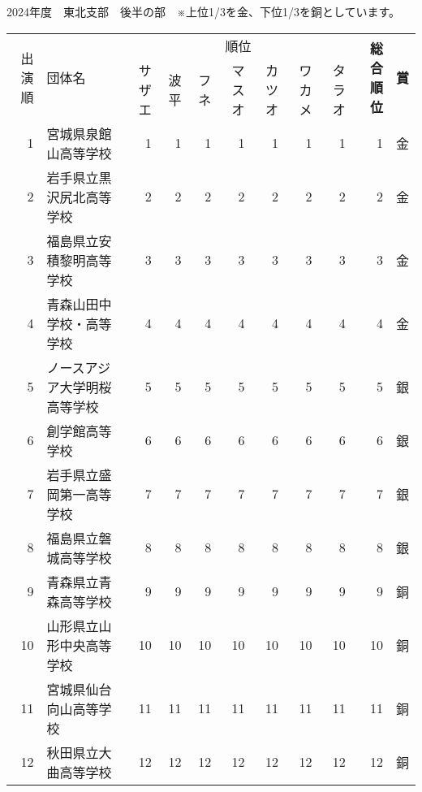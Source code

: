 \documentclass[11pt,a4paper,landscape,twoside,openany,english,uplatex]{jsarticle}
\begin{document}
2024年度　東北支部　後半の部　※上位1/3を金、下位1/3を銅としています。
\begin{table}[H]
 \centering
 \begin{tabular}{r|l|rrrrrrr|r|c}
  \hline
  \multirow{2}{*}{出演順} & \multirow{2}{*}{団体名} & \multicolumn{7}{|c|}{順位} & \multirow{2}{*}{\textbf{総合順位}} &  \multirow{2}{*}{\textbf{賞}} \\
  \cline{3-9} %
    &  & サザエ & 波平 & フネ & マスオ &  カツオ & ワカメ & タラオ &  &  \\
  \hline \hline
   1 & 宮城県泉館山高等学校         &  1 &  1 &  1 &  1 &  1 &  1 &  1 &  1 & 金 \\
   2 & 岩手県立黒沢尻北高等学校     &  2 &  2 &  2 &  2 &  2 &  2 &  2 &  2 & 金 \\
   3 & 福島県立安積黎明高等学校     &  3 &  3 &  3 &  3 &  3 &  3 &  3 &  3 & 金 \\
   4 & 青森山田中学校・高等学校     &  4 &  4 &  4 &  4 &  4 &  4 &  4 &  4 & 金 \\
   5 & ノースアジア大学明桜高等学校 &  5 &  5 &  5 &  5 &  5 &  5 &  5 &  5 & 銀 \\
   6 & 創学館高等学校               &  6 &  6 &  6 &  6 &  6 &  6 &  6 &  6 & 銀 \\
   7 & 岩手県立盛岡第一高等学校     &  7 &  7 &  7 &  7 &  7 &  7 &  7 &  7 & 銀 \\
   8 & 福島県立磐城高等学校         &  8 &  8 &  8 &  8 &  8 &  8 &  8 &  8 & 銀 \\
   9 & 青森県立青森高等学校         &  9 &  9 &  9 &  9 &  9 &  9 &  9 &  9 & 銅 \\
  10 & 山形県立山形中央高等学校     & 10 & 10 & 10 & 10 & 10 & 10 & 10 & 10 & 銅 \\
  11 & 宮城県仙台向山高等学校       & 11 & 11 & 11 & 11 & 11 & 11 & 11 & 11 & 銅 \\
  12 & 秋田県立大曲高等学校         & 12 & 12 & 12 & 12 & 12 & 12 & 12 & 12 & 銅 \\
  \hline
 \end{tabular}
\end{table}
\end{document}
